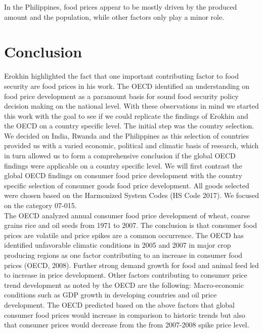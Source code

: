 \documentclass[11pt]{article}
\begin{document}
In the Philippines, food prices appear to be mostly driven by the produced amount and the population, while other factors only play a minor role.


\section{Conclusion}
Erokhin highlighted the fact that one important contributing factor to food security are food prices in his work. The OECD identified an understanding on food price development as a paramount basis for sound food security policy decision making on the national level. With these observations in mind we started this work with the goal to see if we could replicate the findings of Erokhin and the OECD on a country specific level. The initial step was the country selection. We decided on India, Rwanda and the Philippines as this selection of countries provided us with a varied economic, political and climatic basis of research, which in turn allowed us to form a comprehensive conclusion if the global OECD findings were applicable on a country specific level. 
We will first contrast the global OECD findings on consumer food price development with the country specific selection of consumer goods food price development. All goods selected were chosen based on the Harmonized System Codes (HS Code 2017). We focused on the category 07-015. \\
The OECD analyzed annual consumer food price development of wheat, coarse grains rice and oil seeds from 1971 to 2007. The conclusion is that consumer food prices are volatile and price spikes are a common occurrence. The OECD has identified unfavorable climatic conditions in 2005 and 2007 in major crop producing regions as one factor contributing to an increase in consumer food prices (OECD, 2008). Further strong demand growth for food and animal feed led to increase in price development. Other factors contributing to consumer price trend development as noted by the OECD are the following: Macro-economic conditions such as GDP growth in developing countries and oil price development. The OECD predicted based on the above factors that global consumer food prices would increase in comparison to historic trends but also that consumer prices would decrease from the from 2007-2008 spike price level. \\
\end{document}
